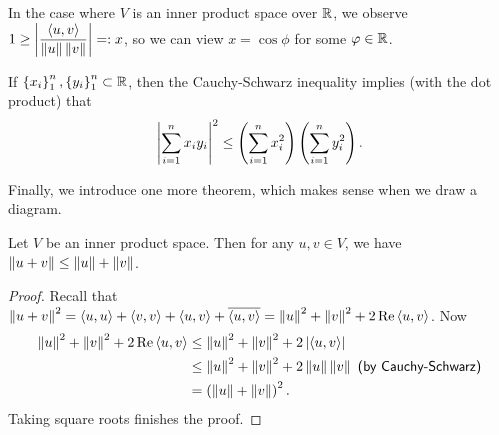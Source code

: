 \documentclass{article}
\begin{document}
In the case where $V$ is an inner product space over $\mathbb R$, we observe $\displaystyle 1\geq \left|\frac{\left\langle u, v\right\rangle}{\left\Vert u\right\Vert\left\Vert v\right\Vert}\right|=: x$, so we can view $x = \cos \phi$ for some $\varphi\in\mathbb R$.
\begin{example}
If $\left\{x_i\right\}_1^n, \left\{y_i\right\}_1^n\subset \mathbb R$, then the Cauchy-Schwarz inequality implies (with the dot product) that
$$\left|\sum_{i=1}^n x_iy_i\right|^2 \leq \left( \sum_{i=1}^n x_i^2 \right)\left( \sum_{i=1}^n y_i^2 \right).$$
\end{example}
\newpage
Finally, we introduce one more theorem, which makes sense when we draw a diagram.
\begin{theorem}
Let $V$ be an inner product space. Then for any $u, v\in V$, we have $\left\Vert u+v\right\Vert\leq \left\Vert u\right\Vert + \left\Vert v\right\Vert$.
\begin{center}
\end{center}
\end{theorem}
\begin{proof}
Recall that $\left\Vert u+v\right\Vert^2 = \left\langle u,u\right\rangle + \left\langle v,v\right\rangle + \left\langle u,v\right\rangle + \overline{\left\langle u,v\right\rangle} = \left\Vert u\right\Vert^2 + \left\Vert v\right\Vert^2 + 2\operatorname{Re}\left\langle u,v\right\rangle$. Now
\begin{align*}
\left\Vert u\right\Vert^2 + \left\Vert v\right\Vert^2 + 2\operatorname{Re}\left\langle u,v\right\rangle &\leq \left\Vert u\right\Vert^2 + \left\Vert v\right\Vert^2 + 2\left|\left\langle u,v\right\rangle\right|\\
&\leq \left\Vert u\right\Vert^2 +\left\Vert v\right\Vert^2 + 2\left\Vert u\right\Vert\left\Vert v\right\Vert \textsf{ (by Cauchy-Schwarz)} \\
&= \left(\left\Vert u\right\Vert + \left\Vert v\right\Vert \right)^2.
\end{align*}
Taking square roots finishes the proof.
\end{proof}
\end{document}
